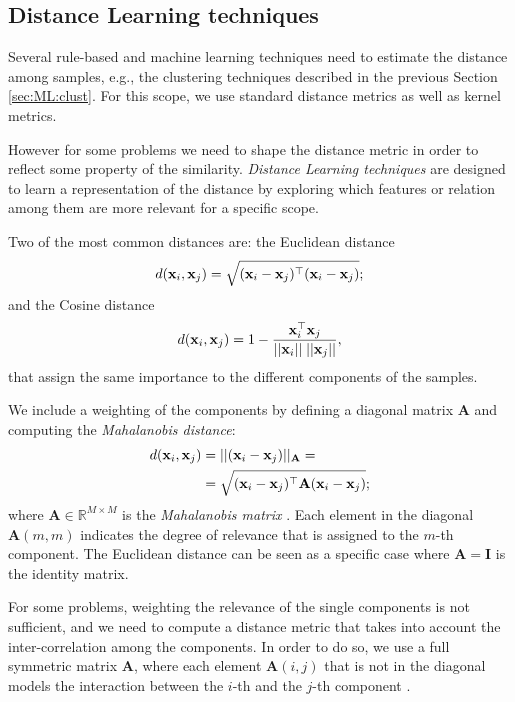 \subsection{Distance Learning techniques}\label{sec:ML:dist}
Several rule-based and machine learning techniques need to estimate the distance among samples, e.g., the clustering techniques described in the previous Section \ref{sec:ML:clust}. For this scope, we use standard distance metrics as well as kernel metrics. 

However for some problems we need to shape the distance metric in order to reflect some property of the similarity. \textit{Distance Learning techniques} are designed to learn a representation of the distance by exploring which features or relation among them are more relevant for a specific scope. 

Two of the most common distances are: the Euclidean distance
\begin{equation}
d(\mathbf{x}_i,\mathbf{x}_j)=\sqrt{(\mathbf{x}_i-\mathbf{x}_j)^\top (\mathbf{x}_i-\mathbf{x}_j)};
\end{equation}
and the Cosine distance
\begin{equation}
d(\mathbf{x}_i,\mathbf{x}_j)=1- \frac{\mathbf{x}_i^\top \mathbf{x}_j}{||\mathbf{x}_i||\; ||\mathbf{x}_j||},
\end{equation}
that assign the same importance to the different components of the samples.

We include a weighting of the components by defining a diagonal matrix $\mathbf{A}$ and computing the \textit{Mahalanobis distance}:
\begin{equation}
\begin{split}
d(\mathbf{x}_i,\mathbf{x}_j) & =  ||(\mathbf{x}_i-\mathbf{x}_j)||_\mathbf{A} = \\
& =\sqrt{(\mathbf{x}_i-\mathbf{x}_j)^\top \mathbf{A} (\mathbf{x}_i-\mathbf{x}_j)};
\end{split}
\label{eq:ML:mahalanobis}  
\end{equation}
where $\mathbf{A} \in \mathbb{R}^{M \times M}$ is the \textit{Mahalanobis matrix} \cite{xing2003distance}. Each element in the diagonal $\mathbf{A}(m,m)$ indicates the degree of relevance that is assigned to the $m$-th component. The Euclidean distance can be seen as a specific case where $\mathbf{A}=\mathbf{I}$ is the identity matrix.

For some problems, weighting the relevance of the single components is not sufficient, and we need to compute a distance metric that takes into account the inter-correlation among the components. In order to do so, we use a full symmetric matrix $\mathbf{A}$, where each element $\mathbf{A}(i,j)$ that is not in the diagonal models the interaction between the $i$-th and the $j$-th component \cite{xing2003distance}.

